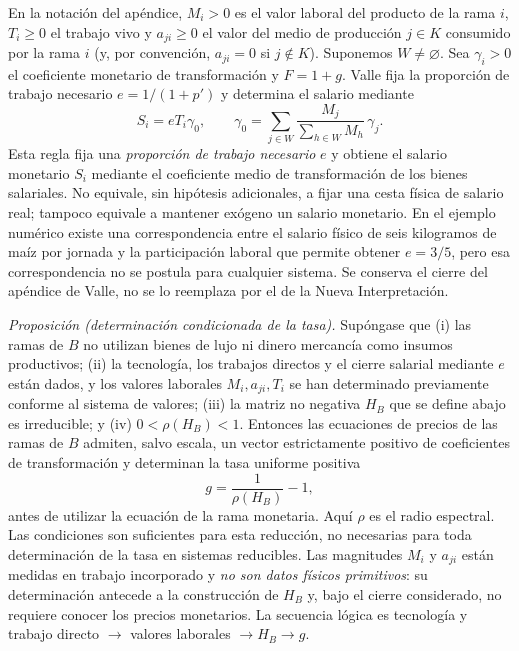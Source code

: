 \documentclass[10pt,twoside]{article}
\begin{document}
En la notación del apéndice, $M_i>0$ es el valor laboral del producto de la rama $i$, $T_i\geq0$ el trabajo vivo y $a_{ji}\geq0$ el valor del medio de producción $j\in K$ consumido por la rama $i$ (y, por convención, $a_{ji}=0$ si $j\notin K$). Suponemos $W\neq\varnothing$. Sea $\gamma_i>0$ el coeficiente monetario de transformación y $F=1+g$. Valle fija la proporción de trabajo necesario $e=1/(1+p')$ y determina el salario mediante
\begin{equation}
S_i=eT_i\gamma_0,\qquad
\gamma_0=\sum_{j\in W}\frac{M_j}{\sum_{h\in W}M_h}\,\gamma_j.
\label{eq:salario_general}
\end{equation}
Esta regla fija una \emph{proporción de trabajo necesario} $e$ y obtiene el salario monetario $S_i$ mediante el coeficiente medio de transformación de los bienes salariales. No equivale, sin hipótesis adicionales, a fijar una cesta física de salario real; tampoco equivale a mantener exógeno un salario monetario. En el ejemplo numérico existe una correspondencia entre el salario físico de seis kilogramos de maíz por jornada y la participación laboral que permite obtener $e=3/5$, pero esa correspondencia no se postula para cualquier sistema. Se conserva el cierre del apéndice de Valle, no se lo reemplaza por el de la Nueva Interpretación.

\noindent\textit{Proposición (determinación condicionada de la tasa).} Supóngase que (i) las ramas de $B$ no utilizan bienes de lujo ni dinero mercancía como insumos productivos; (ii) la tecnología, los trabajos directos y el cierre salarial mediante $e$ están dados, y los valores laborales $M_i,a_{ji},T_i$ se han determinado previamente conforme al sistema de valores; (iii) la matriz no negativa $H_B$ que se define abajo es irreducible; y (iv) $0<\rho(H_B)<1$. Entonces las ecuaciones de precios de las ramas de $B$ admiten, salvo escala, un vector estrictamente positivo de coeficientes de transformación y determinan la tasa uniforme positiva
\begin{equation}
g=\frac{1}{\rho(H_B)}-1,\label{eq:generalPF}
\end{equation}
antes de utilizar la ecuación de la rama monetaria. Aquí $\rho$ es el radio espectral. Las condiciones son suficientes para esta reducción, no necesarias para toda determinación de la tasa en sistemas reducibles. Las magnitudes $M_i$ y $a_{ji}$ están medidas en trabajo incorporado y \emph{no son datos físicos primitivos}: su determinación antecede a la construcción de $H_B$ y, bajo el cierre considerado, no requiere conocer los precios monetarios. La secuencia lógica es tecnología y trabajo directo $\rightarrow$ valores laborales $\rightarrow H_B\rightarrow g$.
\end{document}
